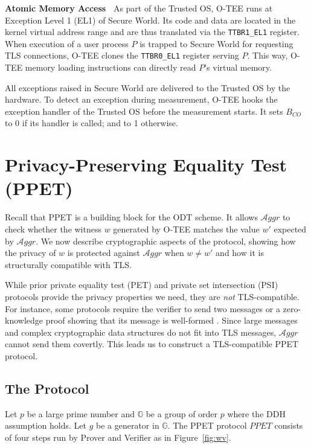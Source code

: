 \documentclass[letterpaper,twocolumn,10pt]{article}
\newcommand{\T}{\ensuremath{\mathcal{A}ggr}\xspace}
\newcommand{\GG}{\mathbb{G}}
\newcommand{\mypara}[1]{\vspace{.5em}\noindent\textbf{{#1}~}}
\begin{document}
\mypara{Atomic Memory Access}
As part of the Trusted OS, O-TEE runs at Exception Level 1 (EL1) of Secure World. Its code and data are
located in the kernel virtual address range and are thus translated via the \texttt{TTBR1\_EL1} register.
When execution of a user process $P$ is trapped to Secure World for requesting TLS connections,
O-TEE clones the \texttt{TTBR0\_EL1} register serving $P$. This way, O-TEE memory loading instructions
can directly read $P$'s virtual memory.

All exceptions raised in Secure World are delivered to the Trusted OS by the hardware. To detect an
exception during measurement, O-TEE hooks the exception handler of the Trusted OS before the measurement starts.
It sets $B_{CO}$ to 0 if its handler is called; and to 1 otherwise.


\section{Privacy-Preserving Equality Test (PPET)}
\label{sec:eq_prot}
Recall that PPET is a building block for the ODT scheme. It
allows \T to check whether the witness $w$ generated by O-TEE matches the value $w'$ expected by \T.
We now describe cryptographic aspects of the protocol, showing how the privacy of $w$
is protected against \T when $w\neq w'$ and how it is structurally compatible with TLS.

While prior private equality test (PET) \cite{lipmaaVerifiableHomomorphicOblivious2003,PET86}
and private set intersection (PSI) \cite{PSI,PSI_tsudik,PSI99} protocols provide the privacy
properties we need, they are \emph{not} TLS-compatible. For instance, some protocols require the
verifier to send two messages \cite{lipmaaVerifiableHomomorphicOblivious2003} or a zero-knowledge
proof showing that its message is well-formed \cite{PSI_tsudik}. Since large messages and complex
cryptographic data structures do not fit into TLS messages, \T cannot send them covertly.
This leads us to construct a TLS-compatible PPET protocol.

\subsection{The Protocol}
Let $p$ be a large prime number and $\GG$ be a group of order $p$ where the DDH assumption \cite{ddh} holds.
Let $g$ be a generator in $\GG$. The PPET protocol $\mathit{PPET}$
consists of four steps run by Prover and Verifier as in Figure~\ref{fig:wv}.
\end{document}

